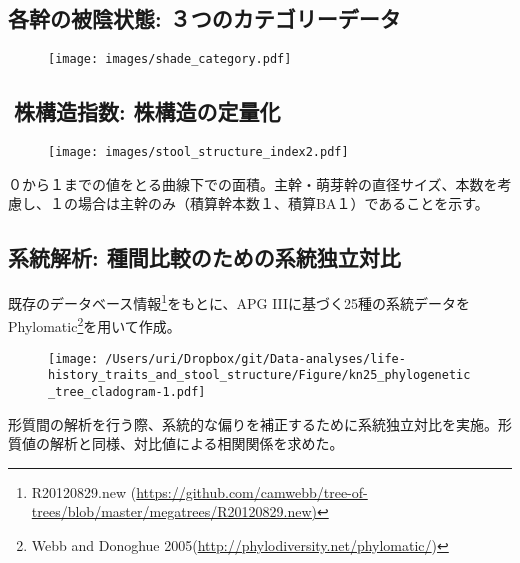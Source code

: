 \documentclass[a0, 30pt, plainboxedsections]{sciposter} %
\begin{document}
\begin{multicols}{3}
{\subsection*{\small{各幹の被陰状態: ３つのカテゴリーデータ}}

\begin{figure}
	\centering
	\texttt{[image: images/shade\_category.pdf]}
\end{figure}

\columnbreak
\subsection*{\small{株構造指数: 株構造の定量化}}

\begin{wrapfigure}{r}[6]{10em}
   \texttt{[image: images/stool\_structure\_index2.pdf]}
\end{wrapfigure}

０から１までの値をとる曲線下での面積。主幹・萌芽幹の直径サイズ、本数を考慮し、１の場合は主幹のみ（積算幹本数１、積算BA１）であることを示す。

\vspace{1em}
\subsection*{\small{系統解析: 種間比較のための系統独立対比}}

既存のデータベース情報\footnote{R20120829.new (\url{https://github.com/camwebb/tree-of-trees/blob/master/megatrees/R20120829.new)}}をもとに、APG IIIに基づく25種の系統データをPhylomatic\footnote{Webb and Donoghue 2005(\url{http://phylodiversity.net/phylomatic/})}を用いて作成。

\begin{wrapfigure}{r}{16em}
  \texttt{[image: /Users/uri/Dropbox/git/Data-analyses/life-history\_traits\_and\_stool\_structure/Figure/kn25\_phylogenetic\_tree\_cladogram-1.pdf]}
\end{wrapfigure}

\vspace{1em} 形質間の解析を行う際、系統的な偏りを補正するために系統独立対比を実施。形質値の解析と同様、対比値による相関関係を求めた。

}\end{multicols}
\begin{mdframed}[style=section.frame]
  \centering\LARGE\textbf{\color{white}{結果}}
\end{mdframed}
\end{document}
